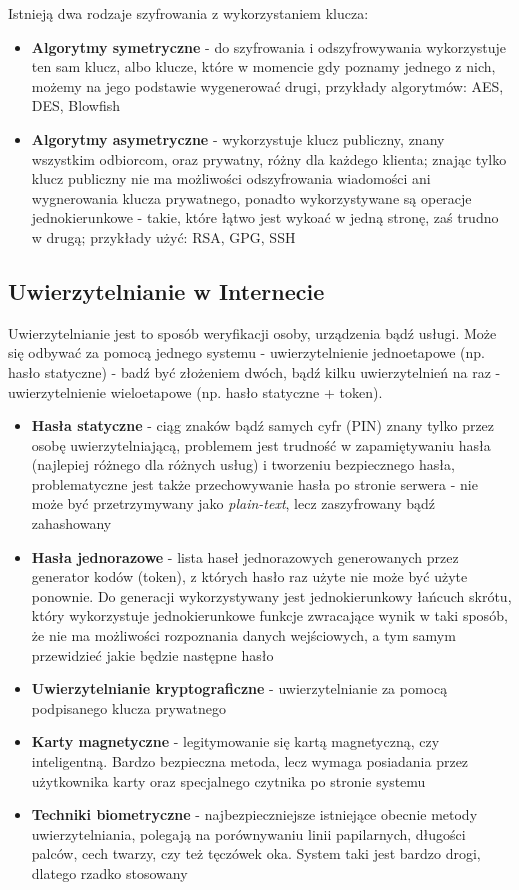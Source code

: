 Istnieją dwa rodzaje szyfrowania z wykorzystaniem klucza:
\begin{itemize}
	\item \textbf{Algorytmy symetryczne} - do szyfrowania i odszyfrowywania wykorzystuje ten sam klucz, albo klucze, które w momencie gdy poznamy jednego z nich, możemy na jego podstawie wygenerować drugi, przykłady algorytmów: AES, DES, Blowfish
	\item \textbf{Algorytmy asymetryczne} - wykorzystuje klucz publiczny, znany wszystkim odbiorcom, oraz prywatny, różny dla każdego klienta; znając tylko klucz publiczny nie ma możliwości odszyfrowania wiadomości ani wygnerowania klucza prywatnego, ponadto wykorzystywane są operacje jednokierunkowe - takie, które łątwo jest wykoać w jedną stronę, zaś trudno w drugą; przykłady użyć: RSA, GPG, SSH 
\end{itemize}

\subsection{Uwierzytelnianie w Internecie}

Uwierzytelnianie jest to sposób weryfikacji osoby, urządzenia bądź usługi. Może się odbywać za pomocą jednego systemu - uwierzytelnienie jednoetapowe (np. hasło statyczne) - badź być złożeniem dwóch, bądź kilku uwierzytelnień na raz - uwierzytelnienie wieloetapowe (np. hasło statyczne + token).
\begin{itemize}
	\item \textbf{Hasła statyczne} - ciąg znaków bądź samych cyfr (PIN) znany tylko przez osobę uwierzytelniającą, problemem jest trudność w zapamiętywaniu hasła (najlepiej różnego dla różnych usług) i tworzeniu bezpiecznego hasła, problematyczne jest także przechowywanie hasła po stronie serwera - nie może być przetrzymywany jako \textit{plain-text}, lecz zaszyfrowany bądź zahashowany
    \item \textbf{Hasła jednorazowe} - lista haseł jednorazowych generowanych przez generator kodów (token), z których hasło raz użyte nie może być użyte ponownie. Do generacji wykorzystywany jest jednokierunkowy łańcuch skrótu, który wykorzystuje jednokierunkowe funkcje zwracające wynik w taki sposób, że nie ma możliwości rozpoznania danych wejściowych, a tym samym przewidzieć jakie będzie następne hasło
    \item \textbf{Uwierzytelnianie kryptograficzne} - uwierzytelnianie za pomocą podpisanego klucza prywatnego
    \item \textbf{Karty magnetyczne} - legitymowanie się kartą magnetyczną, czy inteligentną. Bardzo bezpieczna metoda, lecz wymaga posiadania przez użytkownika karty oraz specjalnego czytnika po stronie systemu
    \item \textbf{Techniki biometryczne} - najbezpieczniejsze istniejące obecnie metody uwierzytelniania, polegają na porównywaniu linii papilarnych, długości palców, cech twarzy, czy też tęczówek oka. System taki jest bardzo drogi, dlatego rzadko stosowany
\end{itemize}
